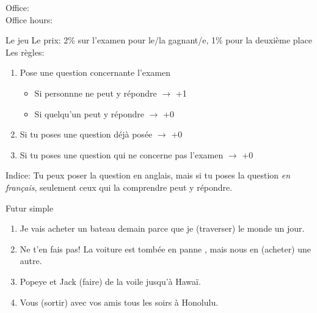 \documentclass{beamer}
\subtitle[Révision, examen 2]{Révision de l'examen 2 (Ch 8 \& 9)}
\begin{document}
  \begin{frame}
    \titlepage
    \tiny{Office: \\
          Office hours: }
  \end{frame}

  \begin{frame}{Le jeu}
    \alert{Le prix:} 2\% sur l'examen pour le/la gagnant/e, 1\% pour la deuxième place \\
    \vspace{0.25cm}
    \alert{Les règles:}
    \begin{enumerate}
      \item Pose une question concernante l'examen
      \begin{itemize}
        \item Si personnne ne peut y répondre $\to$ +1
        \item Si quelqu'un peut y répondre $\to$ +0
      \end{itemize}
      \item Si tu poses une question déjà posée $\to$ +0
      \item Si tu poses une question qui ne concerne pas l'examen $\to$ +0
    \end{enumerate}
    \vspace{0.25cm}
    \alert{Indice:} Tu peux poser la question en anglais, mais si tu poses la question \emph{en français}, seulement ceux qui la comprendre peut y répondre.
  \end{frame}

  \begin{frame}{Futur simple}
    \begin{enumerate}
      \item Je vais acheter un bateau demain parce que je \underline{} (traverser) le monde un jour.
      \item Ne t'en fais pas! La voiture est tombée en panne , mais nous en \underline{} (acheter) une autre.
      \item Popeye et Jack \underline{} (faire) de la voile jusqu'à Hawaï.
      \item Vous \underline{} (sortir) avec vos amis tous les soirs à Honolulu.
    \end{enumerate}
  \end{frame}
\end{document}
